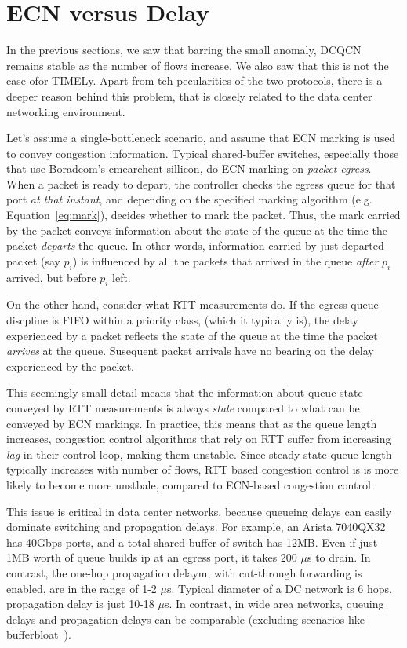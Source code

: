 \section {ECN versus Delay}

In the previous sections, we saw that barring the small anomaly, DCQCN remains
stable as the number of flows increase. We also saw that this is not the case
ofor TIMELy. Apart from teh pecularities of the two protocols, there is a deeper
reason behind this problem, that is closely related to the data center
networking environment. 

Let's assume a single-bottleneck scenario, and assume that ECN marking is used
to convey congestion information. Typical shared-buffer switches, especially
those that use Boradcom's cmearchent sillicon, do ECN marking on {\em packet
egress}. When a packet is ready to depart, the controller checks the egress
queue for that port {\em at that instant}, and depending on the specified
marking algorithm (e.g.  Equation~\ref{eq:mark}), decides whether to mark the
packet. Thus, the mark carried by the packet conveys information about the state
of the queue at the time the packet {\em departs} the queue. In other words,
information carried by just-departed packet (say $p_i$) is influenced by all the
packets that arrived in the queue {\em after} $p_i$ arrived, but before $p_i$
left. 

On the other hand, consider what RTT measurements do. If the egress queue
discpline is FIFO within a priority class, (which it typically is), the delay
experienced by a packet reflects the state of the queue at the time the packet
{\em arrives} at the queue. Susequent packet arrivals have no bearing on the
delay experienced by the packet. 

This seemingly small detail means that the information about queue state
conveyed by RTT measurements is always {\em stale} compared to what can be
conveyed by ECN markings. In practice, this means that as the queue length
increases, congestion control algorithms that rely on RTT suffer from increasing
{\em lag} in their control loop, making them unstable. Since steady state queue
length typically increases with number of flows, RTT based congestion control is
is more likely to become more unstbale, compared to ECN-based congestion control.

This issue is critical in data center networks, because queueing delays can
easily dominate switching and propagation delays.  For example, an Arista
7040QX32 has 40Gbps ports, and a total shared buffer of switch has 12MB. Even if
just 1MB worth of queue builds ip at an egress port, it takes 200 $\mu$s to
drain. In contrast, the one-hop propagation delaym, with cut-through forwarding
is enabled, are in the range of 1-2 $\mu$s. Typical diameter of a DC network is
6 hops, propagation delay is just 10-18 $\mu$s. In contrast, in wide area
networks, queuing delays and propagation delays can be comparable (excluding
scenarios like bufferbloat~\cite{bufferbloat}). 

